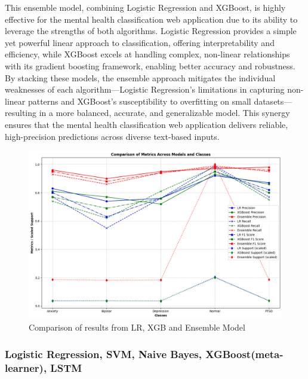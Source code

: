 \vspace{1em}

\noindent
This ensemble model, combining Logistic Regression and XGBoost, is highly effective for the mental health classification web application due to its ability to leverage the strengths of both algorithms. Logistic Regression provides a simple yet powerful linear approach to classification, offering interpretability and efficiency, while XGBoost excels at handling complex, non-linear relationships with its gradient boosting framework, enabling better accuracy and robustness. By stacking these models, the ensemble approach mitigates the individual weaknesses of each algorithm—Logistic Regression's limitations in capturing non-linear patterns and XGBoost's susceptibility to overfitting on small datasets—resulting in a more balanced, accurate, and generalizable model. This synergy ensures that the mental health classification web application delivers reliable, high-precision predictions across diverse text-based inputs.

\begin{figure}[h!]  
    \centering
    \includegraphics[width=1.0\textwidth]{Images/EM RESULT.png}  
    \caption{Comparison of results from LR, XGB and Ensemble Model}
    \label{dfdl1244883}  %
\end{figure}

\subsubsection{Logistic Regression, SVM, Naive Bayes, XGBoost(meta-learner), LSTM}

